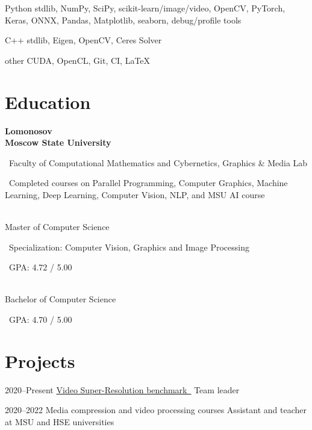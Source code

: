\documentclass{tccv}
\newcommand{\itempoint}{\faAngleDoubleRight~}
\begin{document}
\begin{factlist}

\item{Python}
     {stdlib, NumPy, SciPy, scikit-learn/image/video, OpenCV, PyTorch, Keras, ONNX, Pandas, Matplotlib, seaborn, debug/profile tools}

\item{C++}
     {stdlib, Eigen, OpenCV, Ceres Solver}

\item{other}
     {CUDA, OpenCL, Git, CI, \LaTeX}

\end{factlist}

\vspace{200pt}

\section{Education}

{\Large\textbf{Lomonosov\\Moscow State University}}
\smallskip     

     \itempoint Faculty of Computational Mathematics and Cybernetics, Graphics \& Media Lab
     
     \itempoint Completed courses on Parallel Programming, Computer Graphics, Machine Learning, Deep Learning, Computer Vision, NLP, and MSU AI course

\bigskip
{\\[1pt]}%
{\Large{Master of Computer Science}}
\smallskip


     \itempoint Specialization: Computer Vision, Graphics and Image Processing


     \itempoint GPA: 4.72 / 5.00

\bigskip
{\\[1pt]}%
{\Large{Bachelor of Computer Science}}
\smallskip

     \itempoint GPA: 4.70 / 5.00

\section{Projects}

\begin{yearlist}

\item{2020--Present}
     {\href{https://videoprocessing.ai/benchmarks/video-super-resolution.html}{Video Super-Resolution benchmark~\faExternalLink*}}
     {Team leader}

\item{2020--2022}
     {Media compression and video processing courses}
     {Assistant and teacher at MSU and HSE universities} 

\end{yearlist}
\end{document}
